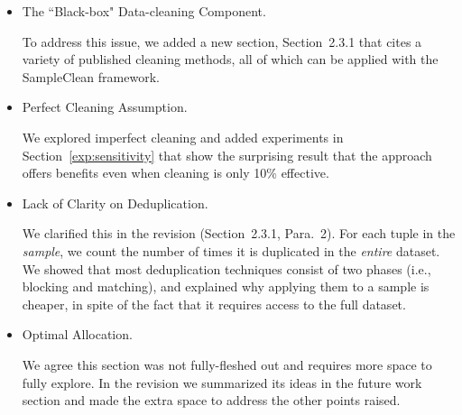 \begin{itemize}

  \item The ``Black-box" Data-cleaning Component.
  
To address this issue, we added a new section, Section~2.3.1 that cites a variety of published cleaning methods, all of which
can be applied with the SampleClean framework.

  \item Perfect Cleaning Assumption. 

We explored imperfect
cleaning and added experiments in Section~\ref{exp:sensitivity} that show the surprising
result that the approach offers benefits even when cleaning is only
10\% effective.

  \item Lack of Clarity on Deduplication.
  
   We clarified this in the revision (Section~2.3.1, Para.~2). For each tuple in the
\emph{sample}, we count the number of times it is duplicated in the \emph{entire} dataset.
%
%
We showed that most deduplication techniques consist of two phases
(i.e., blocking and matching), and explained why applying them to a
sample is cheaper, in spite of the fact that it requires access to the
full dataset. \vspace{-.5em}



  \item Optimal Allocation. 

We agree this section was not fully-fleshed out and requires more
space to fully explore.  
In the revision we summarized its ideas in the future work section and made the extra space to address the other points raised.


\end{itemize}
